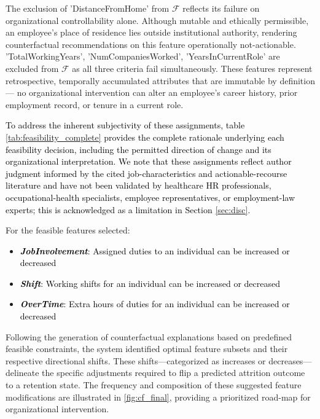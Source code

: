 \documentclass[a4paper,fleqn]{cas-sc}
\begin{document}
The exclusion of 'DistanceFromHome' from $\mathcal{F}$ reflects its failure on organizational controllability alone. Although mutable and ethically permissible, an employee's place of residence lies outside institutional authority, rendering counterfactual recommendations on this feature operationally not-actionable.
'TotalWorkingYears', 'NumCompaniesWorked', 'YearsInCurrentRole' are excluded from $\mathcal{F}$ as all three criteria fail simultaneously. These features represent retrospective, temporally accumulated attributes that are immutable by definition — no organizational intervention can alter an employee's career history, prior employment record, or tenure in a current role. 

\textcolor{black}{To address the inherent subjectivity of these assignments, table \ref{tab:feasibility_complete} provides the complete rationale underlying each feasibility decision, including the permitted direction of change and its organizational interpretation. We note that these assignments reflect author judgment informed by the cited job-characteristics and actionable-recourse literature \cite{ustun2019actionable, karimi2021algorithmic, hackman1976motivation} and have not been validated by healthcare HR professionals, occupational-health specialists, employee representatives, or employment-law experts; this is acknowledged as a limitation in Section \ref{sec:disc}.}

For the feasible features selected:
\begin{itemize}
    \item \textcolor{black}{\textit{\textbf{JobInvolvement}}: Assigned duties to an individual can be increased or decreased}
    \item \textcolor{black}{\textit{\textbf{Shift}}: Working shifts for an individual can be increased or decreased}
    \item \textcolor{black}{\textit{\textbf{OverTime}}: Extra hours of duties for an individual can be increased or decreased}
\end{itemize}

Following the generation of counterfactual explanations based on predefined feasible constraints, the system identified optimal feature subsets and their respective directional shifts. These shifts—categorized as increases or decreases—delineate the specific adjustments required to flip a predicted attrition outcome to a retention state. The frequency and composition of these suggested feature modifications are illustrated in \cref{fig:cf_final}, providing a prioritized road-map for organizational intervention.
\end{document}
